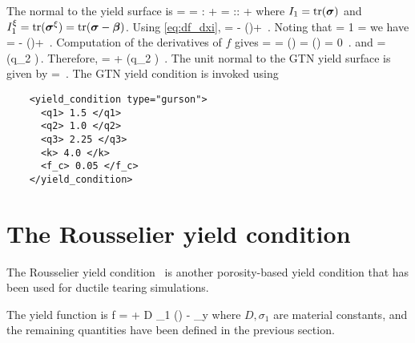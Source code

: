   The normal to the yield surface is
  \Beq
    \BN = 
        = :\Partial{\Bxi}{\Bsig} + 
        = :\Partial{\Bxi}{\BsT}:\Partial{\BsT}{\Bsig} + 
  \Eeq
  where $I_1 = \text{tr}(\boldsymbol{\sigma})$ and $I_1^\xi = \text{tr}(\boldsymbol{\sigma}^\xi) = \text{tr}(\boldsymbol{\sigma} - \boldsymbol{\beta})$.  
  Using \eqref{eq:df_dxi},
  \Beq
    \BN =  - \Third \Tr\left(\right)\BI +
           \,.
  \Eeq
  Noting that
  \Beq
     = 1 \quad \Tand \quad
     = \BI
  \Eeq
  we have
  \Beq
    \BN =  - \Third \Tr\left(\right)\BI +
           \BI \,.
  \Eeq
  Computation of the derivatives of $f$ gives
  \Beq
     =  \Partial{\sigma^\xi_\Teq}{\Bxi}
      =  \left(\right) \frac{\Bxi}{\Norm{\Bxi}{}}
      =  
    \quad \implies \quad
    \Tr\left(\right) = 0 \,.
  \Eeq
  and
  \Beq
     = 
     \sinh \left(q_2 \right)\,.
  \Eeq
  Therefore,
  \Beq
    \BN = 
      +  \sinh \left(q_2 \right) \BI\,.
  \Eeq
  The unit normal to the GTN yield surface is given by
  \Beq
    \hat{\BN} = \frac{\BN}{\Norm{\BN}{}} \,.
  \Eeq
  The GTN yield condition is invoked using
  \lstset{language=XML}
  \begin{lstlisting}
    <yield_condition type="gurson">
      <q1> 1.5 </q1>
      <q2> 1.0 </q2>
      <q3> 2.25 </q3>
      <k> 4.0 </k>
      <f_c> 0.05 </f_c>
    </yield_condition>
  \end{lstlisting}

\section{The Rousselier yield condition}
  The Rousselier yield condition~\cite{Bernauer2002} is another porosity-based yield
  condition that has been used for ductile tearing simulations.

  The yield function is
  \Beq
    f  =  +
         D \sigma_1 \phi \exp \left(\right) -
         \sigma_y 
  \Eeq
  where $D,\sigma_1$ are material constants, and the remaining quantities have been
  defined in the previous section.

